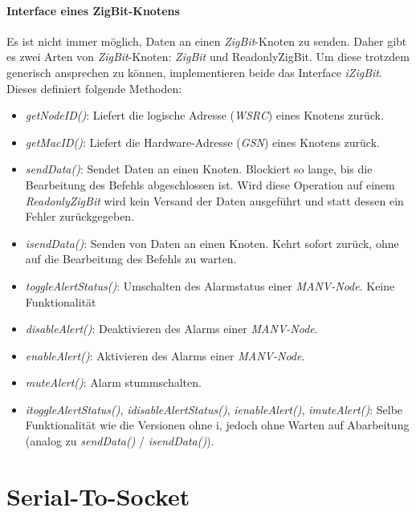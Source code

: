     \paragraph{Interface eines ZigBit-Knotens}

    Es ist nicht immer möglich, Daten an einen \emph{ZigBit}-Knoten zu senden. Daher gibt
    es zwei Arten von \emph{ZigBit}-Knoten: \emph{ZigBit} und {ReadonlyZigBit}. Um diese trotzdem
    generisch ansprechen zu können, implementieren beide das Interface \emph{iZigBit}. Dieses definiert folgende Methoden:

    \begin{itemize}
        \item{\emph{getNodeID()}:} Liefert die logische Adresse (\emph{WSRC}) eines Knotens zurück.
        \item{\emph{getMacID()}:} Liefert die Hardware-Adresse (\emph{GSN}) eines Knotens zurück.
        \item{\emph{sendData()}:} Sendet Daten an einen Knoten. Blockiert so lange, bis die Bearbeitung des
                           Befehls abgeschlossen ist. Wird diese Operation auf einem \emph{ReadonlyZigBit} wird
                           kein Versand der Daten ausgeführt und statt dessen ein Fehler zurückgegeben.
        \item{\emph{isendData()}:} Senden von Daten an einen Knoten. Kehrt sofort zurück, ohne auf die Bearbeitung
                            des Befehls zu warten. 
        \item{\emph{toggleAlertStatus()}:} Umschalten des Alarmstatus einer \emph{MANV-Node}. Keine Funktionalität
        \item{\emph{disableAlert()}:} Deaktivieren des Alarms einer \emph{MANV-Node}.
        \item{\emph{enableAlert()}:} Aktivieren des Alarms einer \emph{MANV-Node}.
        \item{\emph{muteAlert()}:} Alarm stummschalten.
        \item{\emph{itoggleAlertStatus()}, \emph{idisableAlertStatus()}, \emph{ienableAlert()}, \emph{imuteAlert()}}: Selbe Funktionalität
            wie die Versionen ohne i, jedoch ohne Warten auf Abarbeitung (analog zu \emph{sendData()} / \emph{isendData()}).
    \end{itemize}

    \section{Serial-To-Socket}

